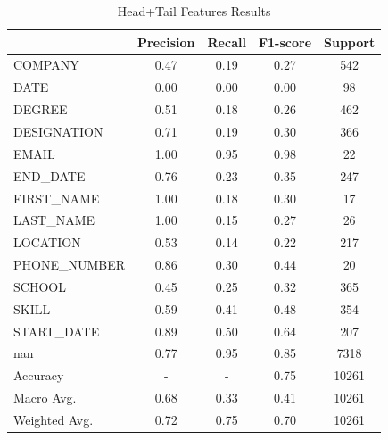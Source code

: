 \documentclass[a4paper, conference]{ieeeconf}
\begin{document}
  \begin{table}[ht!]
    \centering
    \begin{tabular}{|l|c|c|c|c|}
         \hline
             & Precision & Recall & F1-score & Support \\
         \hline
     COMPANY & 0.47 & 0.19 & 0.27 &   542 \\
        DATE & 0.00 & 0.00 & 0.00 &    98 \\
      DEGREE & 0.51 & 0.18 & 0.26 &   462 \\
 DESIGNATION & 0.71 & 0.19 & 0.30 &   366 \\
       EMAIL & 1.00 & 0.95 & 0.98 &    22 \\
    END\_DATE & 0.76 & 0.23 & 0.35 &   247 \\
  FIRST\_NAME & 1.00 & 0.18 & 0.30 &    17 \\
   LAST\_NAME & 1.00 & 0.15 & 0.27 &    26 \\
    LOCATION & 0.53 & 0.14 & 0.22 &   217 \\
PHONE\_NUMBER & 0.86 & 0.30 & 0.44 &    20 \\
      SCHOOL & 0.45 & 0.25 & 0.32 &   365 \\
       SKILL & 0.59 & 0.41 & 0.48 &   354 \\
  START\_DATE & 0.89 & 0.50 & 0.64 &   207 \\
         nan & 0.77 & 0.95 & 0.85 &  7318 \\

         \hline
    Accuracy &  -  &  -  & 0.75 & 10261 \\
   Macro Avg. & 0.68 & 0.33 & 0.41 & 10261 \\
Weighted Avg. & 0.72 & 0.75 & 0.70 & 10261 \\
         \hline
    \end{tabular}
    \caption{Head+Tail Features Results}
    \label{table:5}
  \end{table}
\end{document}
